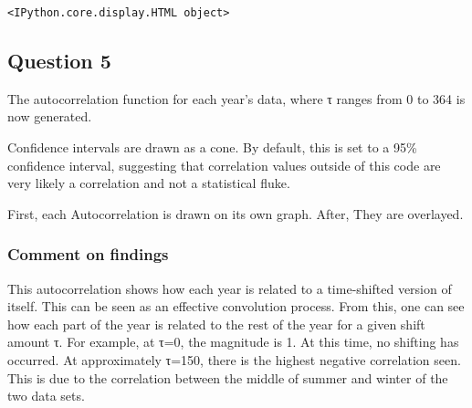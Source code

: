 \documentclass[11pt]{article}
\begin{document}
    
    \begin{verbatim}
<IPython.core.display.HTML object>
    \end{verbatim}

    
    \subsection{Question 5}\label{question-5}

The autocorrelation function for each year's data, where τ ranges from 0
to 364 is now generated.

Confidence intervals are drawn as a cone. By default, this is set to a
95\% confidence interval, suggesting that correlation values outside of
this code are very likely a correlation and not a statistical fluke.

First, each Autocorrelation is drawn on its own graph. After, They are
overlayed.

\subsubsection{Comment on findings}\label{comment-on-findings}

This autocorrelation shows how each year is related to a time-shifted
version of itself. This can be seen as an effective convolution process.
From this, one can see how each part of the year is related to the rest
of the year for a given shift amount τ. For example, at τ=0, the
magnitude is 1. At this time, no shifting has occurred. At approximately
τ=150, there is the highest negative correlation seen. This is due to
the correlation between the middle of summer and winter of the two data
sets.
\end{document}
